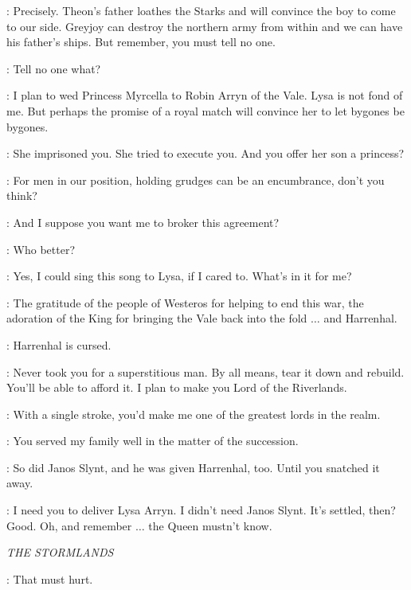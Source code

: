 \TYRION: Precisely. Theon's father loathes the Starks and will convince the boy to come to our side. Greyjoy can destroy the northern army from within and we can have his father's ships. But remember, you must tell no one. 


\LITTLEFINGER: Tell no one what? 

\TYRION: I plan to wed Princess Myrcella to Robin Arryn of the Vale. Lysa is not fond of me. But perhaps the promise of a royal match will convince her to let bygones be bygones. 

\LITTLEFINGER: She imprisoned you. She tried to execute you. And you offer her son a princess? 

\TYRION: For men in our position, holding grudges can be an encumbrance, don't you think? 

\LITTLEFINGER: And I suppose you want me to broker this agreement? 

\TYRION: Who better? 

\LITTLEFINGER: Yes, I could sing this song to Lysa, if I cared to. What's in it for me? 

\TYRION: The gratitude of the people of Westeros for helping to end this war, the adoration of the King for bringing the Vale back into the fold $\ldots$ and Harrenhal. 

\LITTLEFINGER: Harrenhal is cursed. 

\TYRION: Never took you for a superstitious man. By all means, tear it down and rebuild. You'll be able to afford it. I plan to make you Lord of the Riverlands. 

\LITTLEFINGER: With a single stroke, you'd make me one of the greatest lords in the realm. 

\TYRION: You served my family well in the matter of the succession. 

\LITTLEFINGER: So did Janos Slynt, and he was given Harrenhal, too. Until you snatched it away. 

\TYRION: I need you to deliver Lysa Arryn. I didn't need Janos Slynt.  It's settled, then? Good. Oh, and remember $\ldots$ the Queen mustn't know. 


\scene

\textit{THE STORMLANDS} 


\RENLY: That must hurt. 

